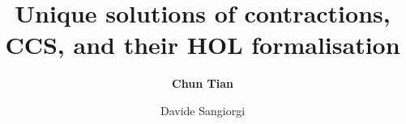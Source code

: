 \documentclass{beamer}
\begin{document}
\title[Unique solutions of contractions ...]{Unique solutions of
  contractions, CCS, and their HOL formalisation}

\author[C. Tian and D. Sangiorgi]{\textbf{Chun Tian}  \and
  Davide Sangiorgi }



\begin{frame}
\titlepage
\end{frame}


\end{document}
